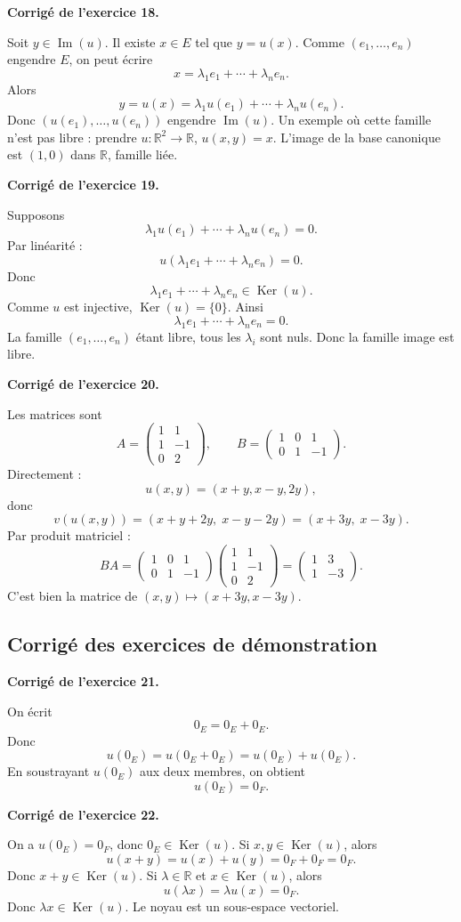 \documentclass[11pt,a4paper]{article}
\newcommand{\corr}[1]{
    \vspace{0.4cm}
    \noindent\textbf{\textcolor{blue!60!black}{Corrigé de l'exercice #1.}}
    \par\vspace{0.1cm}
}
\newcommand{\Ker}{\operatorname{Ker}}
\newcommand{\Img}{\operatorname{Im}}
\begin{document}
\corr{18}
Soit $y\in\Img(u)$. Il existe $x\in E$ tel que $y=u(x)$. Comme $(e_1,\dots,e_n)$ engendre $E$, on peut écrire
\[
x=\lambda_1e_1+\cdots+\lambda_ne_n.
\]
Alors
\[
y=u(x)=\lambda_1u(e_1)+\cdots+\lambda_nu(e_n).
\]
Donc $(u(e_1),\dots,u(e_n))$ engendre $\Img(u)$.
Un exemple où cette famille n'est pas libre : prendre $u:\mathbb{R}^2\to\mathbb{R}$, $u(x,y)=x$. L'image de la base canonique est $(1,0)$ dans $\mathbb{R}$, famille liée.

\corr{19}
Supposons
\[
\lambda_1u(e_1)+\cdots+\lambda_nu(e_n)=0.
\]
Par linéarité :
\[
u(\lambda_1e_1+\cdots+\lambda_ne_n)=0.
\]
Donc
\[
\lambda_1e_1+\cdots+\lambda_ne_n\in\Ker(u).
\]
Comme $u$ est injective, $\Ker(u)=\{0\}$. Ainsi
\[
\lambda_1e_1+\cdots+\lambda_ne_n=0.
\]
La famille $(e_1,\dots,e_n)$ étant libre, tous les $\lambda_i$ sont nuls. Donc la famille image est libre.

\corr{20}
Les matrices sont
\[
A=
\begin{pmatrix}
1&1\\
1&-1\\
0&2
\end{pmatrix},
\qquad
B=
\begin{pmatrix}
1&0&1\\
0&1&-1
\end{pmatrix}.
\]
Directement :
\[
u(x,y)=(x+y,x-y,2y),
\]
donc
\[
v(u(x,y))=(x+y+2y,\;x-y-2y)=(x+3y,\;x-3y).
\]
Par produit matriciel :
\[
BA=
\begin{pmatrix}
1&0&1\\
0&1&-1
\end{pmatrix}
\begin{pmatrix}
1&1\\
1&-1\\
0&2
\end{pmatrix}
=
\begin{pmatrix}
1&3\\
1&-3
\end{pmatrix}.
\]
C'est bien la matrice de $(x,y)\mapsto(x+3y,x-3y)$.

\subsection{Corrigé des exercices de démonstration}

\corr{21}
On écrit
\[
0_E=0_E+0_E.
\]
Donc
\[
u(0_E)=u(0_E+0_E)=u(0_E)+u(0_E).
\]
En soustrayant $u(0_E)$ aux deux membres, on obtient
\[
u(0_E)=0_F.
\]

\corr{22}
On a $u(0_E)=0_F$, donc $0_E\in\Ker(u)$.
Si $x,y\in\Ker(u)$, alors
\[
u(x+y)=u(x)+u(y)=0_F+0_F=0_F.
\]
Donc $x+y\in\Ker(u)$.
Si $\lambda\in\mathbb{R}$ et $x\in\Ker(u)$, alors
\[
u(\lambda x)=\lambda u(x)=0_F.
\]
Donc $\lambda x\in\Ker(u)$. Le noyau est un sous-espace vectoriel.
\end{document}
